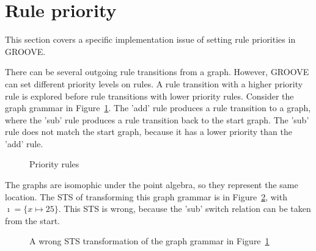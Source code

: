 \section{Rule priority}
This section covers a specific implementation issue of setting rule priorities in GROOVE.

There can be several outgoing rule transitions from a graph. However, GROOVE can set different priority levels on rules. A rule transition with a higher priority rule is explored before rule transitions with lower priority rules. Consider the graph grammar in Figure~\ref{fig:priority_gg}. The 'add' rule produces a rule transition to a graph, where the 'sub' rule produces a rule transition back to the start graph. The 'sub' rule does not match the start graph, because it has a lower priority than the 'add' rule.

\begin{figure}[ht]
  \begin{center}
    \hspace{20px}
    \hspace{20px}
    \hspace{20px}
    \hspace{20px}
  \end{center}
  \caption{Priority rules}
  \label{fig:priority_gg}
\end{figure} 

The graphs are isomophic under the point algebra, so they represent the same location. The STS of transforming this graph grammar is in Figure~\ref{fig:priority_sts_wrong}, with $\imath = \{x \mapsto 25\}$. This STS is wrong, because the 'sub' switch relation can be taken from the start.

\begin{figure}[ht]
  \begin{center}
    
  \end{center}
  \caption{A wrong STS transformation of the graph grammar in Figure~\ref{fig:priority_gg}}
  \label{fig:priority_sts_wrong}
\end{figure}


